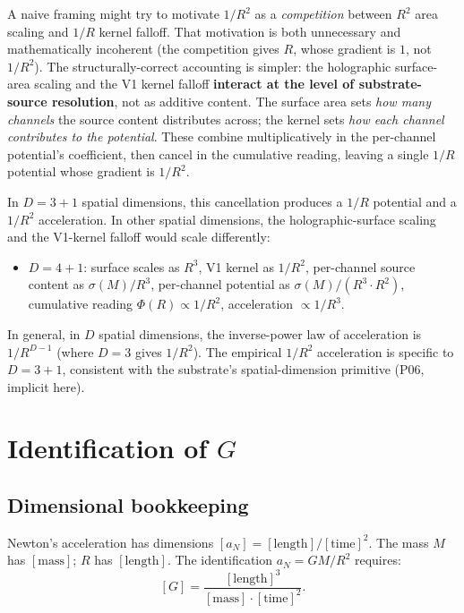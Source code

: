 \documentclass[11pt,a4paper]{article}
\begin{document}
A naive framing might try to motivate $1/R^2$ as a \emph{competition} between $R^2$ area scaling and $1/R$ kernel falloff. That motivation is both unnecessary and mathematically incoherent (the competition gives $R$, whose gradient is $1$, not $1/R^2$). The structurally-correct accounting is simpler: the holographic surface-area scaling and the V1 kernel falloff \textbf{interact at the level of substrate-source resolution}, not as additive content. The surface area sets \emph{how many channels} the source content distributes across; the kernel sets \emph{how each channel contributes to the potential}. These combine multiplicatively in the per-channel potential's coefficient, then cancel in the cumulative reading, leaving a single $1/R$ potential whose gradient is $1/R^2$.

In $D = 3+1$ spatial dimensions, this cancellation produces a $1/R$ potential and a $1/R^2$ acceleration. In other spatial dimensions, the holographic-surface scaling and the V1-kernel falloff would scale differently:

\begin{itemize}[noitemsep]
\item $D = 4+1$: surface scales as $R^3$, V1 kernel as $1/R^2$, per-channel source content as $\sigma(M)/R^3$, per-channel potential as $\sigma(M)/(R^3 \cdot R^2)$, cumulative reading $\Phi(R) \propto 1/R^2$, acceleration $\propto 1/R^3$.
\end{itemize}

In general, in $D$ spatial dimensions, the inverse-power law of acceleration is $1/R^{D-1}$ (where $D = 3$ gives $1/R^2$). The empirical $1/R^2$ acceleration is specific to $D = 3+1$, consistent with the substrate's spatial-dimension primitive (P06, implicit here).

\section{Identification of $G$}

\subsection{Dimensional bookkeeping}

Newton's acceleration has dimensions $[a_N] = [\text{length}]/[\text{time}]^2$. The mass $M$ has $[\text{mass}]$; $R$ has $[\text{length}]$. The identification $a_N = GM/R^2$ requires:
\[
[G] = \frac{[\text{length}]^3}{[\text{mass}] \cdot [\text{time}]^2}.
\]
\end{document}
